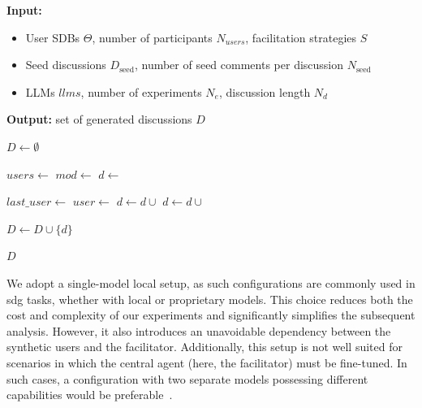 \begin{algorithm}[ht]
	\caption{Experimental setup for the facilitation experiments using our \ac{sdg} framework.}
	\label{alg:exp_generation}
	\begin{flushleft}
		\textbf{Input:}
		\begin{itemize}
			\item User SDBs $\Theta$, number of participants $N_{users}$, facilitation strategies $S$
			\item Seed discussions $D_{\text{seed}}$, number of seed comments per discussion $N_{\text{seed}}$
			\item LLMs $llms$, number of experiments $N_e$, discussion length $N_d$
		\end{itemize}
		\textbf{Output:} set of generated discussions $D$
	\end{flushleft}
	
	\begin{algorithmic}[1]
		\State $D \gets \emptyset$
		
		
		\State $users \gets$ 
		\State $mod \gets$ 
		\State $d \gets$ 
		
		\State $last\_user \gets$ 
		\State $user \gets$ 
		\State $d \gets d \cup$ 
		\State $d \gets d \cup$ 
		\EndFor
		
		\State $D \gets D \cup \{d\}$
		\EndFor
		\EndFor
		\EndFor
		
		\State \Return $D$
	\end{algorithmic}
\end{algorithm}

We adopt a single-model local setup, as such configurations are commonly used in \ac{sdg} tasks, whether with local or proprietary models. This choice reduces both the cost and complexity of our experiments and significantly simplifies the subsequent analysis. However, it also introduces an unavoidable dependency between the synthetic users and the facilitator. Additionally, this setup is not well suited for scenarios in which the central agent (here, the facilitator) must be fine-tuned. In such cases, a configuration with two separate models possessing different capabilities would be preferable~\cite{ulmer2024}.

